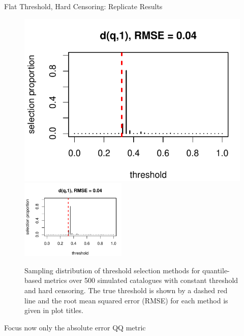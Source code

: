 \begin{frame}{Flat Threshold, Hard Censoring: Replicate Results}
\begin{figure}
    \centering
    \includegraphics[width = 0.45 \textwidth, page = 1]{images/flat_threshold_sim/selected_threshold_summary_individual.pdf}
    \qquad
    \includegraphics[width = 0.45\textwidth, page = 2]{images/flat_threshold_sim/selected_threshold_summary_individual.pdf}
    \caption{Sampling distribution of threshold selection methods for quantile-based metrics over 500 simulated catalogues with constant threshold and hard censoring. The true threshold is shown by a dashed red line and the root mean squared error (RMSE) for each method is given in plot titles.}
    \label{fig:flat_threshold_selection_summary}
\end{figure} 
Focus now only the absolute error QQ metric
\end{frame}

